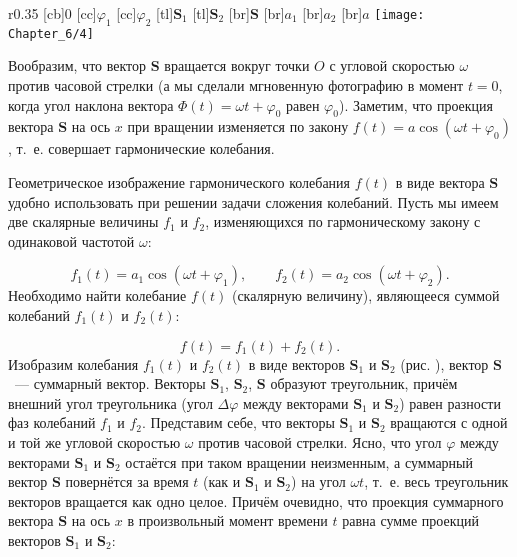 \begin{wrapfigure}[]{r}{0.35\textwidth}
	[cb]{0}
	[cc]{$\varphi_1$}
	[cc]{$\varphi_2$}
	[tl]{$\mathbf{S}_1$}
	[tl]{$\mathbf{S}_2$}
	[br]{$\mathbf{S}$}
	[br]{$a_1$}
	[br]{$a_2$}
	[br]{$a$}
	\texttt{[image: Chapter\_6/4]}
	\caption{}
\end{wrapfigure}

Вообразим, что вектор $\mathbf{S}$ вращается вокруг точки $O$ с угловой скоростью $\omega$ против часовой стрелки (а мы
сделали мгновенную фотографию в момент $t=0$, когда угол наклона вектора $\Phi(t)=\omega t + \varphi_0$ равен $\varphi_0$).
Заметим, что проекция вектора $\mathbf{S}$ на ось $x$ при вращении изменяется по закону $f(t)=a\cos(\omega t+\varphi_0)$, т.~е.
совершает гармонические колебания.

Геометрическое изображение гармонического колебания $f(t)$ в виде вектора $\mathbf{S}$ удобно использовать при решении задачи
сложения колебаний. Пусть мы имеем две скалярные величины $f_1$ и $f_2$, изменяющихся по гармоническому закону с
одинаковой частотой $\omega$:

\begin{equation*}
	f_1(t)=a_1\cos(\omega t+\varphi_1), \qquad f_2(t)=a_2\cos(\omega t+\varphi_2).
\end{equation*}
Необходимо найти колебание $f(t)$ (скалярную величину), являющееся суммой колебаний $f_1(t)$ и $f_2(t)$:

\begin{equation*}
	f(t)=f_1(t)+f_2(t).
\end{equation*}
Изобразим колебания $f_1(t)$ и $f_2(t)$ в виде векторов $\mathbf{S}_1$ и $\mathbf{S}_2$ (рис. ), вектор $\mathbf{S}$~--- суммарный вектор.
Векторы $\mathbf{S}_1$, $\mathbf{S}_2$, $\mathbf{S}$ образуют треугольник, причём внешний угол треугольника (угол $\Delta\varphi$ между
векторами $\mathbf{S}_1$ и $\mathbf{S}_2$) равен разности фаз колебаний $f_1$ и $f_2$. Представим себе, что векторы $\mathbf{S}_1$ и
$\mathbf{S}_2$ вращаются с одной и той же угловой скоростью $\omega$ против часовой стрелки. Ясно, что угол $\varphi$ между
векторами $\mathbf{S}_1$ и $\mathbf{S}_2$ остаётся при таком вращении неизменным, а суммарный вектор $\mathbf{S}$ повернётся за время
$t$ (как и $\mathbf{S}_1$ и $\mathbf{S}_2$) на угол $\omega t$, т.~е. весь треугольник векторов вращается как одно целое. Причём
очевидно, что проекция суммарного вектора $\mathbf{S}$ на ось $x$ в произвольный момент времени $t$ равна сумме проекций
векторов $\mathbf{S}_1$ и $\mathbf{S}_2$:

